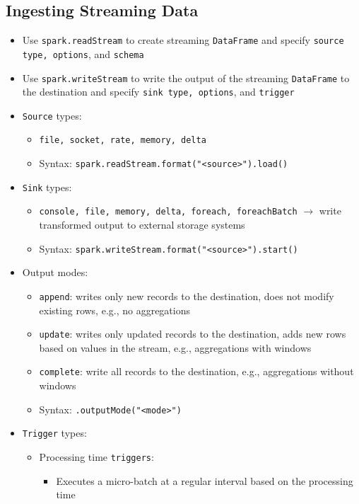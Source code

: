 \documentclass[11pt]{scrartcl}
\begin{document}
\subsection{Ingesting Streaming Data}
\begin{itemize}
	\item Use \texttt{spark.readStream} to create streaming \texttt{DataFrame} and specify \texttt{source type, options}, and \texttt{schema}
	\item Use \texttt{spark.writeStream} to write the output of the streaming \texttt{DataFrame} to the destination and specify \texttt{sink type, options}, and \texttt{trigger}
	\item \texttt{Source} types: 
	\begin{itemize}
		\item \texttt{file, socket, rate, memory, delta}
		\item Syntax: \texttt{spark.readStream.format("<source>").load()}
	\end{itemize}
	\item \texttt{Sink} types: 
	\begin{itemize}
		\item \texttt{console, file, memory, delta, foreach, foreachBatch} $\to$ write transformed output to external storage systems
		\item Syntax: \texttt{spark.writeStream.format("<source>").start()}
	\end{itemize}
	\item Output modes:
	\begin{itemize}
		\item \texttt{append}: writes only new records to the destination, does not modify existing rows, e.g., no aggregations
		\item \texttt{update}: writes only updated records to the destination, adds new rows based on values in the stream, e.g.,  aggregations with windows
		\item \texttt{complete}: write all records to the destination, e.g., aggregations without windows
		\item Syntax: \texttt{.outputMode("<mode>")}
	\end{itemize}
	\item \texttt{Trigger} types:
	\begin{itemize}
		\item Processing time \texttt{triggers}:
		\begin{itemize}
			\item Executes a micro-batch at a regular interval based on the processing time

\end{itemize}
\end{itemize}
\end{itemize}
\end{document}
